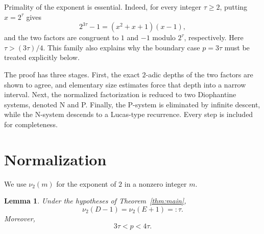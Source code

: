 \documentclass[11pt]{amsart}
\newtheorem{lemma}[theorem]{Lemma}
\theoremstyle{remark}
\newcommand{\vTwo}{\nu_2}
\begin{document}
Primality of the exponent is essential.  Indeed, for every integer
$\tau\ge2$, putting $x=2^\tau$ gives
\[
 2^{3\tau}-1=(x^2+x+1)(x-1),
\]
and the two factors are congruent to $1$ and $-1$ modulo $2^\tau$,
respectively.  Here $\tau>(3\tau)/4$.  This family also explains why
the boundary case $p=3\tau$ must be treated explicitly below.

The proof has three stages.  First, the exact $2$-adic depths of the
two factors are shown to agree, and elementary size estimates force
that depth into a narrow interval.  Next, the normalized factorization
is reduced to two Diophantine systems, denoted N and P.  Finally, the
P-system is eliminated by infinite descent, while the N-system descends
to a Lucas-type recurrence.  Every step is included for completeness.

\section{Normalization}

We use $\vTwo(m)$ for the exponent of $2$ in a nonzero integer $m$.

\begin{lemma}\label{lem:equal-depth}
Under the hypotheses of Theorem~\ref{thm:main},
\[
 \vTwo(D-1)=\vTwo(E+1)=:\tau.
\]
Moreover,
\[
 3\tau<p<4\tau.
\]
\end{lemma}
\end{document}
